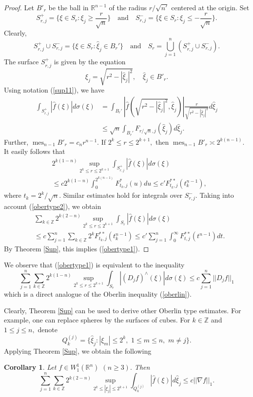 \documentclass[12pt,twoside,reqno]{amsart}
\numberwithin{equation}{section}
\newtheorem{cor}[teo]{Corollary}
\theoremstyle{definition}
\numberwithin{equation}{section}
\def\R{\mathbb{R}}
\def\Z{\mathbb{Z}}
\def\s{\sigma}
\def\mes{\operatorname{mes}}
\begin{document}
\begin{proof} Let $B'_r$ be the ball  in $\R^{n-1}$ of the radius $r/\sqrt{n'}$ centered at the origin. Set
$$
S_{r,j}^+=\{\xi\in S_r:\xi_j\ge\frac{r}{\sqrt{n}}\}\quad\mbox{and}\quad S_{r,j}^-=\{\xi\in S_r:\xi_j\le -\frac{r}{\sqrt{n}}\}.
$$
Clearly,
\begin{equation}\label{obertype2}
S_{r,j}^+\cup S_{r,j}^-=\{\xi\in S_r: \widehat \xi_j\in B_r'\}\quad\mbox{and}\quad S_r=\bigcup_{j=1}^n(S_{r,j}^+\cup S_{r,j}^-).
\end{equation}
The surface $S^+_{r,j}$ is given by the equation
$$
\xi_j=\sqrt{r^2-|\widehat \xi_j|^2}, \quad \widehat \xi_j\in B'_r.
$$
Using notation (\ref{sup11}), we have
$$
\begin{aligned}
\int_{S_{r,j}^+}|\widehat f(\xi)| d\s(\xi)&=\int_{B_r'}\left|\widehat f\left(\sqrt{r^2-|\widehat \xi_j|^2}, \widehat \xi_j\right)\right|\frac{r}{\sqrt{r^2-|\widehat \xi_j|^2}}d\widehat\xi_j\\
&\le \sqrt{n}\int_{B_r'} F_{r/\sqrt{n},j}(\widehat\xi_j)d\widehat\xi_j.
\end{aligned}
$$
Further, $\mes_{n-1}B'_r=c_n r^{n-1}.$ If $2^k\le r\le 2^{k+1},$ then $\mes_{n-1}B'_r\asymp 2^{k(n-1)}.$ It easily follows that
$$
\begin{aligned}
&2^{k(1-n)}\sup_{2^{k}\le r\le 2^{k+1}}\int_{S^+_{r,j}} |\widehat f(\xi)| d\s(\xi)\\
&\le c 2^{k(1-n)} \int_0^{2^{k(n-1)}}F^*_{t_k,j}(u)du\le c'F^{**}_{t_k,j}(t_k^{n-1}),
\end{aligned}
$$
where $t_k=2^k/\sqrt{n}.$
Similar estimates hold for integrals over $S^-_{r,j}.$
Taking into account (\ref{obertype2}), we obtain
$$
\begin{aligned}
&\sum_{k\in\Z} 2^{k(2-n)}\sup_{2^{k}\le r\le 2^{k+1}}\int_{S_r} |\widehat f(\xi)| d\s(\xi)\\
&\le c\sum_{j=1}^n\sum_{k\in\Z} 2^k F^{**}_{t_k,j}(t_k^{n-1})\le c'\sum_{j=1}^n\int_0^\infty F_{t,j}^{**}(t^{n-1})dt.
\end{aligned}
$$
By  Theorem \ref{Sup}, this implies (\ref{obertype1}).

\end{proof}

We observe that (\ref{obertype1}) is equivalent to the inequality
$$
 \sum_{j=1}^n\sum_{k\in\Z} 2^{k(1-n)}\sup_{2^{k}\le r\le 2^{k+1}}\int_{S_r} |(D_jf)^\land(\xi)| d\s(\xi)\le c \sum_{j=1}^n||D_j f||_1
$$
which is a direct analogue of the Oberlin inequality (\ref{oberlin}).

Clearly, Theorem \ref{Sup} can be used to derive other Oberlin type estimates. For example, one can replace spheres by the surfaces of cubes.
For $k\in\Z$ and $1\le j\le n,$ denote
$$
Q_k^{(j)}=\{\widehat\xi_j: |\xi_m|\le 2^k, \,\, 1\le m\le n,\,\, m\not=j\}.
$$
Applying Theorem \ref{Sup}, we obtain the following
\begin{cor}\label{obertype3} Let $f\in W_1^1(\R^n)$ $(n\ge 3).$ Then
\begin{equation}\label{obertype33}
\sum_{j=1}^n \sum_{k\in\Z} 2^{k(2-n)}\sup_{2^{k}\le|\xi_j|\le 2^{k+1}}\int_{Q_k^{(j)}} |\widehat f(\xi)| d\widehat \xi_j\le c ||\nabla f||_1.
\end{equation}
\end{cor}
\end{document}
